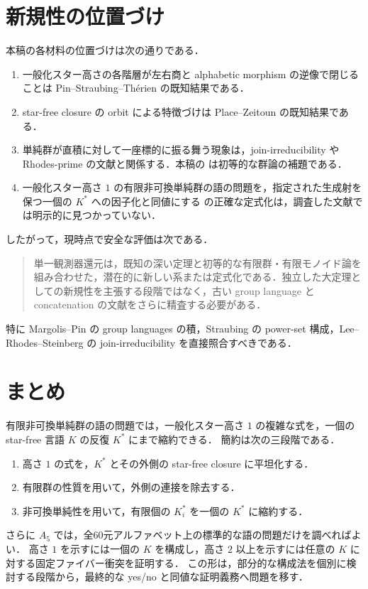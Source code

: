 \section{新規性の位置づけ}

本稿の各材料の位置づけは次の通りである．

\begin{enumerate}
\item 一般化スター高さの各階層が左右商と alphabetic morphism の逆像で閉じることは Pin--Straubing--Th\'erien の既知結果である\cite{PinStraubingTherien1992}．
\item star-free closure の orbit による特徴づけは Place--Zeitoun の既知結果である\cite{PlaceZeitoun2025}．
\item 単純群が直積に対して一座標的に振る舞う現象は，join-irreducibility や Rhodes-prime の文献と関係する\cite{LeeRhodesSteinberg2019,Bergman2026}．本稿の  は初等的な群論の補題である．
\item 一般化スター高さ $1$ の有限非可換単純群の語の問題を，指定された生成射を保つ一個の $K^*$ への因子化と同値にする  の正確な定式化は，調査した文献では明示的に見つかっていない．
\end{enumerate}

したがって，現時点で安全な評価は次である．

\begin{quote}
単一観測器還元は，既知の深い定理と初等的な有限群・有限モノイド論を組み合わせた，潜在的に新しい系または定式化である．独立した大定理としての新規性を主張する段階ではなく，古い group language と concatenation の文献をさらに精査する必要がある．
\end{quote}

特に Margolis--Pin の group languages の積\cite{MargolisPin1985}，Straubing の power-set 構成\cite{Straubing1979}，Lee--Rhodes--Steinberg の join-irreducibility\cite{LeeRhodesSteinberg2019} を直接照合すべきである．

\section{まとめ}

有限非可換単純群の語の問題では，一般化スター高さ $1$ の複雑な式を，一個の star-free 言語 $K$ の反復 $K^*$ にまで縮約できる．
簡約は次の三段階である．

\begin{enumerate}
\item 高さ $1$ の式を，$K^*$ とその外側の star-free closure に平坦化する．
\item 有限群の性質を用いて，外側の連接を除去する．
\item 非可換単純性を用いて，有限個の $K_i^*$ を一個の $K^*$ に縮約する．
\end{enumerate}

さらに $A_5$ では，全60元アルファベット上の標準的な語の問題だけを調べればよい．
高さ $1$ を示すには一個の $K$ を構成し，高さ $2$ 以上を示すには任意の $K$ に対する固定ファイバー衝突を証明する．
この形は，部分的な構成法を個別に検討する段階から，最終的な yes/no と同値な証明義務へ問題を移す．

\printbibliography[title={参考文献}]


